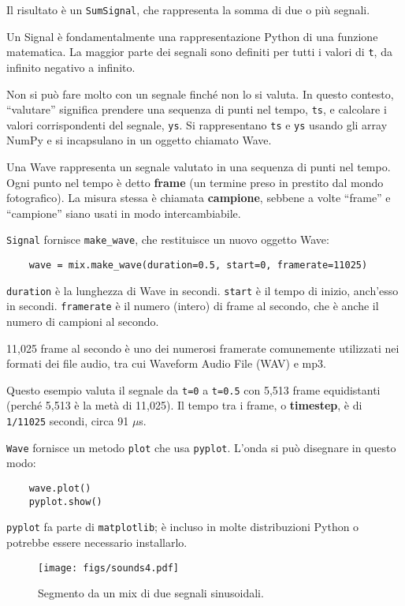 \documentclass[12pt]{book} \usepackage[width=5.5in,height=8.5in, hmarginratio=3:2,vmarginratio=1:1]{geometry}
\begin{document}
Il risultato è un {\tt SumSignal}, che rappresenta la somma di due o più segnali.

Un Signal è fondamentalmente una rappresentazione Python di una funzione matematica. La maggior parte dei segnali sono definiti per tutti i valori di {\tt t}, da infinito negativo a infinito.

Non si può fare molto con un segnale finché non lo si valuta. In questo contesto, ``valutare'' significa prendere una sequenza di punti nel tempo, {\tt ts}, e calcolare i valori corrispondenti del segnale, {\tt ys}. Si rappresentano {\tt ts} e {\tt ys} usando gli array NumPy e si incapsulano in un oggetto chiamato Wave.

Una Wave rappresenta un segnale valutato in una sequenza di punti nel tempo. Ogni punto nel tempo è detto {\bf frame} (un termine preso in prestito dal mondo fotografico). La misura stessa è chiamata {\bf campione}, sebbene a volte ``frame'' e ``campione'' siano usati in modo intercambiabile.

{\tt Signal} fornisce \verb"make_wave", che restituisce un nuovo oggetto Wave:

\begin{verbatim} 
    wave = mix.make_wave(duration=0.5, start=0, framerate=11025)
 \end{verbatim} 

{\tt duration} è la lunghezza di Wave in secondi. {\tt start} è il tempo di inizio, anch'esso in secondi. {\tt framerate} è il numero (intero) di frame al secondo, che è anche il numero di campioni al secondo.

11,025 frame al secondo è uno dei numerosi framerate comunemente utilizzati nei formati dei file audio, tra cui Waveform Audio File (WAV) e mp3.

Questo esempio valuta il segnale da {\tt t=0} a {\tt t=0.5} con 5,513 frame equidistanti (perché 5,513 è la metà di 11,025). Il tempo tra i frame, o {\bf timestep}, è di {\tt 1/11025} secondi, circa 91 $\mu$s.

{\tt Wave} fornisce un metodo {\tt plot} che usa {\tt pyplot}. L'onda si può disegnare in questo modo:

\begin{verbatim} 
    wave.plot()
    pyplot.show()
 \end{verbatim} 

{\tt pyplot} fa parte di {\tt matplotlib}; è incluso in molte distribuzioni Python o potrebbe essere necessario installarlo.

\begin{figure} 

\centerline{\texttt{[image: figs/sounds4.pdf]}} \caption{Segmento da un mix di due segnali sinusoidali.} \label{fig.sounds4} \end{figure} 
\end{document}
